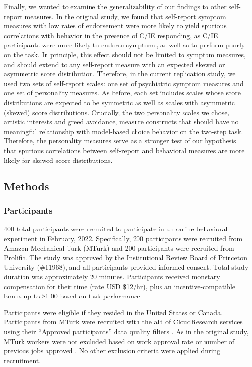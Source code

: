 \documentclass[a4paper,notitlepage,12pt]{article}
\begin{document}
Finally, we wanted to examine the generalizability of our findings to other self-report measures. In the original study, we found that self-report symptom measures with low rates of endorsement were more likely to yield spurious correlations with behavior in the presence of C/IE responding, as C/IE participants were more likely to endorse symptoms, as well as to perform poorly on the task. In principle, this effect should not be limited to symptom measures, and should extend to any self-report measure with an expected skewed or asymmetric score distribution. Therefore, in the current replication study, we used two sets of self-report scales: one set of psychiatric symptom measures and one set of personality measures. As before, each set includes scales whose score distributions are expected to be symmetric as well as scales with asymmetric (skewed) score distributions. Crucially, the two personality scales we chose, artistic interests and greed avoidance, measure constructs that should have no meaningful relationship with model-based choice behavior on the two-step task. Therefore, the personality measures serve as a stronger test of our hypothesis that spurious correlations between self-report and behavioral measures are more likely for skewed score distributions. 

\subsection*{Methods}

\subsubsection*{Participants}

400 total participants were recruited to participate in an online behavioral experiment in February, 2022. Specifically, 200 participants were recruited from Amazon Mechanical Turk (MTurk) and 200 participants were recruited from Prolific. The study was approved by the Institutional Review Board of Princeton University (\#11968), and all participants provided informed consent. Total study duration was approximately 20 minutes. Participants received monetary compensation for their time (rate USD \$12/hr), plus an incentive-compatible bonus up to \$1.00 based on task performance. 

Participants were eligible if they resided in the United States or Canada. Participants from MTurk were recruited with the aid of CloudResearch services \cite{litman2017turkprime-2} using their ``Approved participants''  data quality filters \cite{cloudresearch_2020-2}. As in the original study, MTurk workers were not excluded based on work approval rate or number of previous jobs approved \cite{robinson2019tapped-2}. No other exclusion criteria were applied during recruitment.
\end{document}
